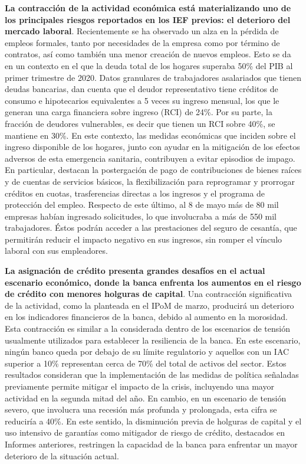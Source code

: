 \documentclass[
]{book}
\begin{document}
\textbf{La contracción de la actividad económica está materializando uno de los principales riesgos reportados en los IEF previos: el deterioro del mercado laboral}. Recientemente se ha observado un alza en la pérdida
de empleos formales, tanto por necesidades de la empresa como por término
de contratos, así como también una menor creación de nuevos empleos. Esto
se da en un contexto en el que la deuda total de los hogares superaba 50\% del
PIB al primer trimestre de 2020. Datos granulares de trabajadores asalariados
que tienen deudas bancarias, dan cuenta que el deudor representativo tiene
créditos de consumo e hipotecarios equivalentes a 5 veces su ingreso mensual,
los que le generan una carga financiera sobre ingreso (RCI) de 24\%. Por su
parte, la fracción de deudores vulnerables, es decir que tienen un RCI sobre
40\%, se mantiene en 30\%. En este contexto, las medidas económicas que
inciden sobre el ingreso disponible de los hogares, junto con ayudar en la
mitigación de los efectos adversos de esta emergencia sanitaria, contribuyen
a evitar episodios de impago. En particular, destacan la postergación de
pago de contribuciones de bienes raíces y de cuentas de servicios básicos, la
flexibilización para reprogramar y prorrogar créditos en cuotas, trasferencias
directas a los ingresos y el programa de protección del empleo. Respecto de
este último, al 8 de mayo más de 80 mil empresas habían ingresado solicitudes,
lo que involucraba a más de 550 mil trabajadores. Éstos podrán acceder a las
prestaciones del seguro de cesantía, que permitirán reducir el impacto negativo
en sus ingresos, sin romper el vínculo laboral con sus empleadores.

\textbf{La asignación de crédito presenta grandes desafíos en el actual escenario económico, donde la banca enfrenta los aumentos en el riesgo de crédito con menores holguras de capital}. Una contracción
significativa de la actividad, como la planteada en el IPoM de marzo, producirá
un deterioro en los indicadores financieros de la banca, debido al aumento en la
morosidad. Esta contracción es similar a la considerada dentro de los escenarios
de tensión usualmente utilizados para establecer la resiliencia de la banca.
En este escenario, ningún banco queda por debajo de su límite regulatorio y
aquellos con un IAC superior a 10\% representan cerca de 70\% del total de
activos del sector. Estos resultados consideran que la implementación de las
medidas de política señaladas previamente permite mitigar el impacto de la
crisis, incluyendo una mayor actividad en la segunda mitad del año. En cambio,
en un escenario de tensión severo, que involucra una recesión más profunda
y prolongada, esta cifra se reduciría a 40\%. En este sentido, la disminución
previa de holguras de capital y el uso intensivo de garantías como mitigador de
riesgo de crédito, destacados en Informes anteriores, restringen la capacidad de
la banca para enfrentar un mayor deterioro de la situación actual.
\end{document}
